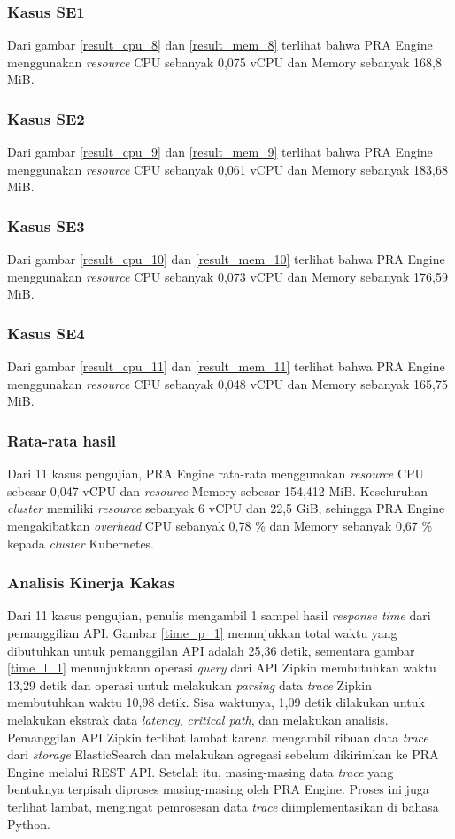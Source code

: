 \subsubsection{Kasus SE1}
Dari gambar \ref{result_cpu_8} dan \ref{result_mem_8} terlihat bahwa PRA Engine menggunakan \textit{resource} CPU sebanyak 0,075 vCPU dan Memory sebanyak 168,8 MiB. 

\subsubsection{Kasus SE2}
Dari gambar \ref{result_cpu_9} dan \ref{result_mem_9} terlihat bahwa PRA Engine menggunakan \textit{resource} CPU sebanyak 0,061 vCPU dan Memory sebanyak 183,68 MiB. 


\subsubsection{Kasus SE3}
Dari gambar \ref{result_cpu_10} dan \ref{result_mem_10} terlihat bahwa PRA Engine menggunakan \textit{resource} CPU sebanyak 0,073 vCPU dan Memory sebanyak 176,59 MiB. 


\subsubsection{Kasus SE4}
Dari gambar \ref{result_cpu_11} dan \ref{result_mem_11} terlihat bahwa PRA Engine menggunakan \textit{resource} CPU sebanyak 0,048 vCPU dan Memory sebanyak 165,75 MiB. 


\subsubsection{Rata-rata hasil}
Dari 11 kasus pengujian, PRA Engine rata-rata menggunakan \textit{resource} CPU sebesar 0,047 vCPU dan \textit{resource} Memory sebesar 154,412 MiB. Keseluruhan \textit{cluster} memiliki \textit{resource} sebanyak 6 vCPU dan 22,5 GiB, sehingga PRA Engine mengakibatkan \textit{overhead} CPU sebanyak 0,78 \% dan Memory sebanyak 0,67 \% kepada \textit{cluster} Kubernetes.

\subsubsection{Analisis Kinerja Kakas}
Dari 11 kasus pengujian, penulis mengambil 1 sampel hasil \textit{response time} dari pemanggilian API. Gambar \ref{time_p_1} menunjukkan total waktu yang dibutuhkan untuk pemanggilan API adalah 25,36 detik, sementara gambar \ref{time_l_1} menunjukkann operasi \textit{query} dari API Zipkin membutuhkan waktu 13,29 detik dan operasi untuk melakukan \textit{parsing} data \textit{trace} Zipkin membutuhkan waktu 10,98 detik. Sisa waktunya, 1,09 detik dilakukan untuk melakukan ekstrak data \textit{latency}, \textit{critical path}, dan  melakukan analisis. Pemanggilan API Zipkin terlihat lambat karena mengambil ribuan data \textit{trace} dari \textit{storage} ElasticSearch dan melakukan agregasi sebelum dikirimkan ke PRA Engine melalui REST API. Setelah itu, masing-masing data \textit{trace} yang bentuknya terpisah diproses masing-masing oleh PRA Engine. Proses ini juga terlihat lambat, mengingat pemrosesan data \textit{trace} diimplementasikan di bahasa Python. 

